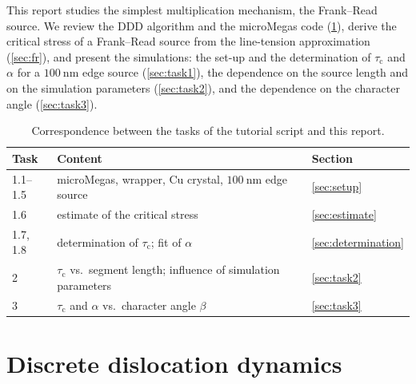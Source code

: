 \documentclass[11pt,a4paper]{article}
\numberwithin{equation}{section}
\theoremstyle{remark}
\newcommand{\tauc}{\tau_{\mathrm{c}}}
\begin{document}
This report studies the simplest multiplication mechanism, the Frank--Read source. We review the DDD
algorithm and the microMegas code (\cref{sec:ddd}), derive the critical stress of a Frank--Read source
from the line-tension approximation (\cref{sec:fr}), and present the simulations: the set-up and the
determination of $\tauc$ and $\alpha$ for a $\SI{100}{\nano\metre}$ edge source (\cref{sec:task1}),
the dependence on the source length and on the simulation parameters (\cref{sec:task2}), and the
dependence on the character angle (\cref{sec:task3}).

\begin{table}[ht]
  \centering
  \caption{Correspondence between the tasks of the tutorial script and this report.}
  \label{tab:taskmap}
  \begin{tabularx}{0.9\linewidth}{lXl}
    \toprule
    Task & Content & Section \\
    \midrule
    1.1--1.5 & microMegas, wrapper, Cu crystal, $\SI{100}{\nano\metre}$ edge source & \ref{sec:setup} \\
    1.6 & estimate of the critical stress & \ref{sec:estimate} \\
    1.7, 1.8 & determination of $\tauc$; fit of $\alpha$ & \ref{sec:determination} \\
    2 & $\tauc$ vs.\ segment length; influence of simulation parameters & \ref{sec:task2} \\
    3 & $\tauc$ and $\alpha$ vs.\ character angle $\beta$ & \ref{sec:task3} \\
    \bottomrule
  \end{tabularx}
\end{table}

\section{Discrete dislocation dynamics}\label{sec:ddd}
\end{document}
